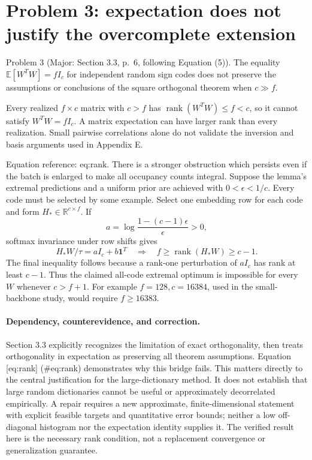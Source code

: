 \documentclass[10pt]{article}
\begin{document}
\section*{Problem 3: expectation does not justify the overcomplete extension}
Problem 3 (Major: Section 3.3, p. 6, following Equation (5)).  The equality \(\mathbb E[W^TW]=fI_c\) for independent random sign codes does not preserve the assumptions or conclusions of the square orthogonal theorem when \(c\gg f\).\par
Every realized \(f\times c\) matrix with \(c>f\) has \(\operatorname{rank}(W^TW)\leq f<c\), so it cannot satisfy \(W^TW=fI_c\). A matrix expectation can have larger rank than every realization. Small pairwise correlations alone do not validate the inversion and basis arguments used in Appendix E.\par
Equation reference: eq:rank. There is a stronger obstruction which persists even if the batch is enlarged to make all occupancy counts integral. Suppose the lemma’s extremal predictions and a uniform prior are achieved with \(0<\epsilon<1/c\). Every code must be selected by some example. Select one embedding row for each code and form \(H_*\in\mathbb R^{c\times f}\). If \[a=\log\frac{1-(c-1)\epsilon}{\epsilon}>0,\] softmax invariance under row shifts gives \[H_*W/\tau=aI_c+b\mathbf1^T
 \quad\Longrightarrow\quad
 f\geq\operatorname{rank}(H_*W)\geq c-1.
 \] The final inequality follows because a rank-one perturbation of \(aI_c\) has rank at least \(c-1\). Thus the claimed all-code extremal optimum is impossible for every \(W\) whenever \(c>f+1\). For example \(f=128,c=16384\), used in the small-backbone study, would require \(f\geq16383\).\par
\paragraph*{Dependency, counterevidence, and correction.}\mbox{}\par
Section 3.3 explicitly recognizes the limitation of exact orthogonality, then treats orthogonality in expectation as preserving all theorem assumptions. Equation [eq:rank] (\#eq:rank) demonstrates why this bridge fails. This matters directly to the central justification for the large-dictionary method. It does not establish that large random dictionaries cannot be useful or approximately decorrelated empirically. A repair requires a new approximate, finite-dimensional statement with explicit feasible targets and quantitative error bounds; neither a low off-diagonal histogram nor the expectation identity supplies it. The verified result here is the necessary rank condition, not a replacement convergence or generalization guarantee.\par
\end{document}
